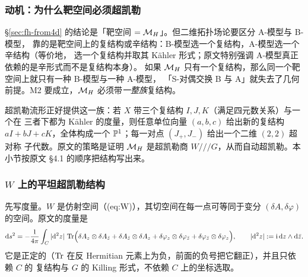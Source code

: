 \subsubsection*{动机：为什么靶空间必须超凯勒}

\S\ref{sec:fh-from4d} 的结论是「靶空间 $=\mathcal{M}_H$」。但二维拓扑场论要区分 A-模型与 B-模型，
靠的是靶空间上的复结构或辛结构：B-模型选一个复结构，A-模型选一个辛结构（等价地，
选一个复结构并取其 Kähler 形式；原文特别强调 A-模型真正依赖的是辛形式而不是复结构本身）。
如果 $\mathcal{M}_H$ 只有一个复结构，那么同一个靶空间上就只有一种 B-模型与一种 A-模型，
「S-对偶交换 B 与 A」就失去了几何前提。M2 要成立，$\mathcal{M}_H$ 必须带\emph{一整族}复结构。

超凯勒流形正好提供这一族：若 $X$ 带三个复结构 $I,J,K$（满足四元数关系）与一个在
三者下都为 Kähler 的度量，则任意单位向量 $(a,b,c)$ 给出新的复结构
$aI+bJ+cK$，全体构成一个 $\mathbb{P}^1$；每一对点 $(J_+,J_-)$ 给出一个二维 $(2,2)$ 超对称
子代数。原文的策略是证明 $\mathcal{M}_H$ 是超凯勒商 $W///G$，从而自动超凯勒。本小节按原文
§4.1 的顺序把结构写出来。

\subsubsection*{$W$ 上的平坦超凯勒结构}

先写度量。$W$ 是仿射空间（(eq:W)），其切空间在每一点可等同于变分 $(\delta A,\delta\varphi)$
的空间。原文的度量是\pA{}
\begin{equation}
\mathrm{d} s^2=-\frac{1}{4\pi}\int_C|\mathrm{d}^2z|\,\operatorname{Tr}\Bigl(
\delta A_z\otimes\delta A_{\bar z}+\delta A_{\bar z}\otimes\delta A_z
+\delta\varphi_z\otimes\delta\varphi_{\bar z}+\delta\varphi_{\bar z}\otimes\delta\varphi_z
\Bigr),\qquad |\mathrm{d}^2z|:=\mathrm{i}\,\mathrm{d} z\wedge\mathrm{d}\bar z .
\label{eq:flat-metric}
\end{equation}
它是正定的（$\operatorname{Tr}$ 在反 Hermitian 元素上为负，前面的负号把它翻正），并且只依赖 $C$ 的
复结构与 $G$ 的 Killing 形式，不依赖 $C$ 上的坐标选取。

